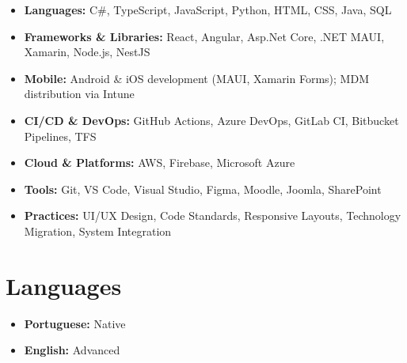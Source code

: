 \documentclass[a4paper,10pt]{article}
\begin{document}
\begin{itemize}[leftmargin=1cm]
    \item \textbf{Languages:} C\#, TypeScript, JavaScript, Python, HTML, CSS, Java, SQL
    \item \textbf{Frameworks \& Libraries:} React, Angular, Asp.Net Core, .NET MAUI, Xamarin, Node.js, NestJS
    \item \textbf{Mobile:} Android \& iOS development (MAUI, Xamarin Forms); MDM distribution via Intune
    \item \textbf{CI/CD \& DevOps:} GitHub Actions, Azure DevOps, GitLab CI, Bitbucket Pipelines, TFS
    \item \textbf{Cloud \& Platforms:} AWS, Firebase, Microsoft Azure
    \item \textbf{Tools:} Git, VS Code, Visual Studio, Figma, Moodle, Joomla, SharePoint
    \item \textbf{Practices:} UI/UX Design, Code Standards, Responsive Layouts, Technology Migration, System Integration
\end{itemize}

\section*{Languages}
\begin{itemize}[leftmargin=1cm]
    \item \textbf{Portuguese:} Native
    \item \textbf{English:} Advanced
\end{itemize}
\end{document}
